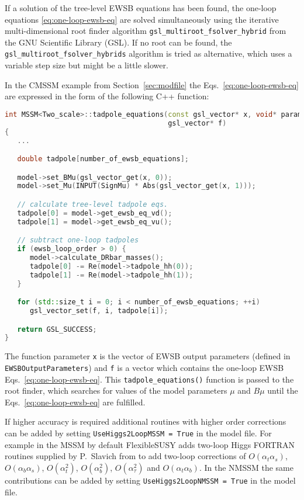 \documentclass[final,3p,11pt,pdflatex]{elsarticle}
\makeatletter
\newcommand{\fs}{FlexibleSUSY\@\xspace}
\newcommand{\code}[1]{\lstinline|#1|}  %
\newcommand{\secref}[1]{Section~\ref{#1}}
\def\at{\alpha_t}
\def\ab{\alpha_b}
\def\as{\alpha_s}
\def\atau{\alpha_{\tau}}
\def\oatab{O(\at\ab)}
\def\oatas{O(\at\as)}
\def\oabas{O(\ab\as)}
\def\oatq{O(\at^2)}
\def\oabq{O(\ab^2)}
\def\oatauq{O(\atau^2)}
\makeatother
\begin{document}
%
If a solution of the tree-level EWSB equations has been found, the
one-loop equations \eqref{eq:one-loop-ewsb-eq} are solved
simultaneously using the iterative multi-dimensional root finder
algorithm \code{gsl_multiroot_fsolver_hybrid} from the GNU Scientific
Library (GSL).  If no root can be found, the
\code{gsl_multiroot_fsolver_hybrids} algorithm is tried as
alternative, which uses a variable step size but might be a little
slower.

In the CMSSM example from \secref{sec:modfile} the
Eqs.~\eqref{eq:one-loop-ewsb-eq} are expressed in the form of the
following C++ function:
%
\begin{lstlisting}[language=C++]
int MSSM<Two_scale>::tadpole_equations(const gsl_vector* x, void* params,
                                       gsl_vector* f)
{
   ...

   double tadpole[number_of_ewsb_equations];

   model->set_BMu(gsl_vector_get(x, 0));
   model->set_Mu(INPUT(SignMu) * Abs(gsl_vector_get(x, 1)));

   // calculate tree-level tadpole eqs.
   tadpole[0] = model->get_ewsb_eq_vd();
   tadpole[1] = model->get_ewsb_eq_vu();

   // subtract one-loop tadpoles
   if (ewsb_loop_order > 0) {
      model->calculate_DRbar_masses();
      tadpole[0] -= Re(model->tadpole_hh(0));
      tadpole[1] -= Re(model->tadpole_hh(1));
   }

   for (std::size_t i = 0; i < number_of_ewsb_equations; ++i)
      gsl_vector_set(f, i, tadpole[i]);

   return GSL_SUCCESS;
}
\end{lstlisting}
%
The function parameter \code{x} is the vector of EWSB output
parameters (defined in \code{EWSBOutputParameters}) and \code{f} is a
vector which contains the one-loop EWSB Eqs.\
\eqref{eq:one-loop-ewsb-eq}.  This \code{tadpole_equations()} function
is passed to the root finder, which searches for values of the model
parameters $\mu$ and $B\mu$ until the Eqs.\
\eqref{eq:one-loop-ewsb-eq} are fulfilled.

If higher accuracy is required additional routines with higher order
corrections can be added by setting \code{UseHiggs2LoopMSSM = True}
in the model file.  For example in the MSSM by default \fs adds
two-loop Higgs FORTRAN routines supplied by P.~Slavich from
\cite{Dedes:2002dy,Dedes:2003km}
to add two-loop corrections of $\oatas$, $\oabas$, $\oatq$,
$\oabq$, $\oatauq$ and $\oatab$.  In the NMSSM the same contributions
can be added by setting \code{UseHiggs2LoopNMSSM = True} in the model
file.
\end{document}
